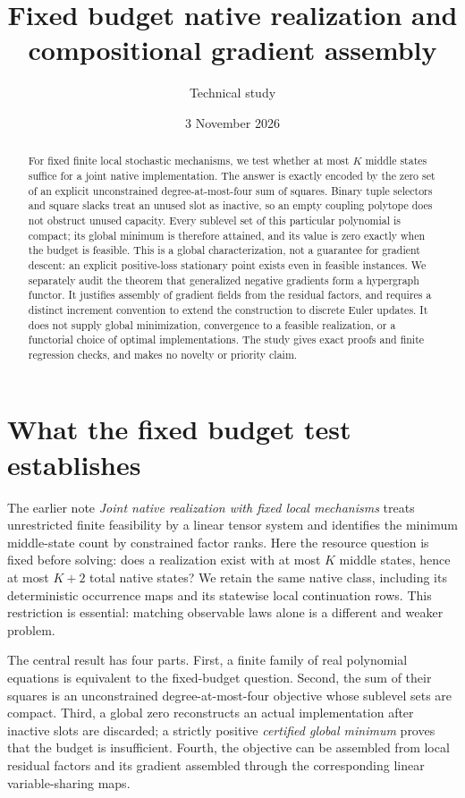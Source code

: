 \documentclass[11pt]{article}
\title{Fixed budget native realization and compositional gradient assembly}
\author{Technical study}
\date{3 November 2026}
\theoremstyle{remark}
\begin{document}
\maketitle

\begin{abstract}
For fixed finite local stochastic mechanisms, we test whether at most $K$ middle states suffice for a joint native implementation. The answer is exactly encoded by the zero set of an explicit unconstrained degree-at-most-four sum of squares. Binary tuple selectors and square slacks treat an unused slot as inactive, so an empty coupling polytope does not obstruct unused capacity. Every sublevel set of this particular polynomial is compact; its global minimum is therefore attained, and its value is zero exactly when the budget is feasible. This is a global characterization, not a guarantee for gradient descent: an explicit positive-loss stationary point exists even in feasible instances. We separately audit the theorem that generalized negative gradients form a hypergraph functor. It justifies assembly of gradient fields from the residual factors, and requires a distinct increment convention to extend the construction to discrete Euler updates. It does not supply global minimization, convergence to a feasible realization, or a functorial choice of optimal implementations. The study gives exact proofs and finite regression checks, and makes no novelty or priority claim.
\end{abstract}

\section{What the fixed budget test establishes}

The earlier note \emph{Joint native realization with fixed local mechanisms} treats unrestricted finite feasibility by a linear tensor system and identifies the minimum middle-state count by constrained factor ranks. Here the resource question is fixed before solving: does a realization exist with at most $K$ middle states, hence at most $K+2$ total native states? We retain the same native class, including its deterministic occurrence maps and its statewise local continuation rows. This restriction is essential: matching observable laws alone is a different and weaker problem.

The central result has four parts. First, a finite family of real polynomial equations is equivalent to the fixed-budget question. Second, the sum of their squares is an unconstrained degree-at-most-four objective whose sublevel sets are compact. Third, a global zero reconstructs an actual implementation after inactive slots are discarded; a strictly positive \emph{certified global minimum} proves that the budget is insufficient. Fourth, the objective can be assembled from local residual factors and its gradient assembled through the corresponding linear variable-sharing maps.
\end{document}
